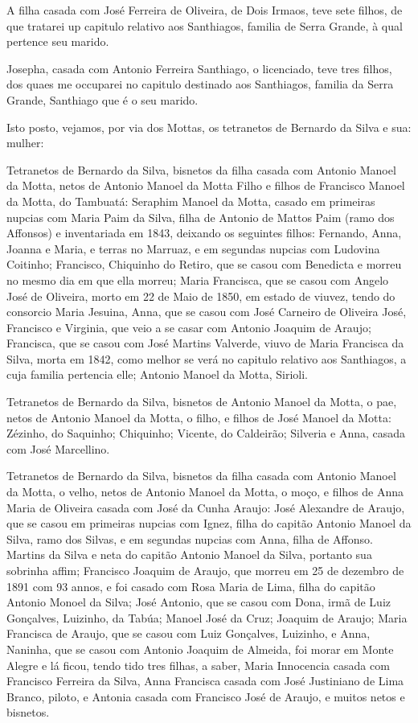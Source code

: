 A filha casada com José Ferreira de Oliveira, de Dois Irmaos, teve sete filhos, de que tratarei up capitulo relativo aos Santhiagos, familia de Serra Grande, à qual pertence seu marido.

Josepha, casada com Antonio Ferreira Santhiago, o licenciado, teve tres filhos, dos quaes me occuparei no capitulo destinado aos Santhiagos, familia da Serra Grande, Santhiago que é o seu marido.

Isto posto, vejamos, por via dos Mottas, os tetranetos de Bernardo da Silva e sua: mulher: 

Tetranetos de Bernardo da Silva, bisnetos da filha casada com Antonio Manoel da Motta, netos de Antonio Manoel da Motta Filho e filhos de Francisco Manoel da Motta, do Tambuatá: Seraphim Manoel da Motta, casado em primeiras nupcias com Maria Paim da Silva, filha de Antonio de Mattos Paim (ramo dos Affonsos) e inventariada em 1843, deixando os seguintes filhos: Fernando, Anna, Joanna e Maria, e terras no Marruaz, e em segundas nupcias com Ludovina Coitinho; Francisco, Chiquinho do Retiro, que se casou com Benedicta e morreu no mesmo dia em que ella morreu; Maria Francisca, que se casou com Angelo José de Oliveira, morto em 22 de Maio de 1850, em estado de viuvez, tendo do consorcio Maria Jesuina, Anna, que se casou com José Carneiro de Oliveira José, Francisco e Virginia, que veio a se casar com Antonio Joaquim de Araujo; Francisca, que se casou com José Martins Valverde, viuvo de Maria Francisca da Silva, morta em 1842, como melhor se verá no capitulo relativo aos Santhiagos, a cuja familia pertencia elle; Antonio Manoel da Motta, Sirioli.

Tetranetos de Bernardo da Silva, bisnetos de Antonio Manoel da Motta, o pae, netos de Antonio Manoel da Motta, o filho, e filhos de José Manoel da Motta: Zézinho, do Saquinho; Chiquinho; Vicente, do Caldeirão; Silveria e Anna, casada com José Marcellino.

Tetranetos de Bernardo da Silva, bisnetos da filha casada com Antonio Manoel da Motta, o velho, netos de Antonio Manoel da Motta, o moço, e filhos de Anna Maria de Oliveira casada com José da Cunha Araujo: José Alexandre de Araujo, que se casou em primeiras nupcias com Ignez, filha do capitão Antonio Manoel da Silva, ramo dos Silvas, e em segundas nupcias com Anna, filha de Affonso. Martins da Silva e neta do capitão Antonio Manoel da Silva, portanto sua sobrinha affim; Francisco Joaquim de Araujo, que morreu em 25 de dezembro de 1891 com 93 annos, e foi casado com Rosa Maria de Lima, filha do capitão Antonio Monoel da Silva; José Antonio, que se casou com Dona, irmã de Luiz Gonçalves, Luizinho, da Tabúa; Manoel José da Cruz; Joaquim
de Araujo; Maria Francisca de Araujo, que se casou com Luiz Gonçalves, Luizinho, e Anna, Naninha, que se casou com Antonio Joaquim de Almeida, foi morar em Monte Alegre e lá ficou, tendo tido tres filhas, a saber, Maria Innocencia casada com Francisco Ferreira da Silva, Anna Francisca casada com José Justiniano de Lima Branco, piloto, e Antonia casada com Francisco José de Araujo, e muitos netos e bisnetos.

